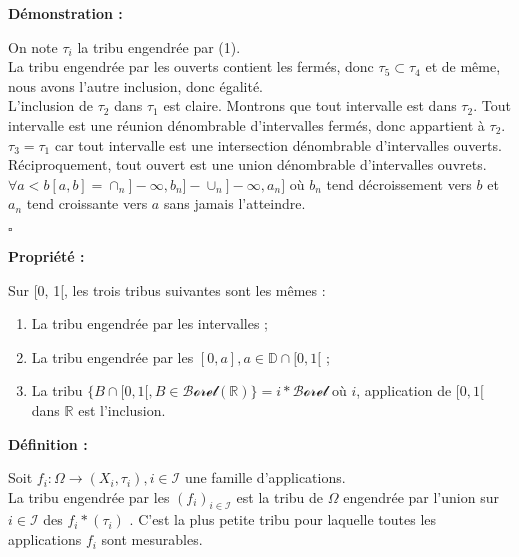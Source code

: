 \documentclass[10pt,a4paper,notitlepage ]{report}
\newcommand{\R}{\mathbb R}
\newenvironment{definition}{
	
	\textbf{Définition : }
}
{}
\newcounter{th}
\newenvironment{propriete}[1][]{
	\begin{tcolorbox}
		\textbf{Propriété #1 : }
}
{\end{tcolorbox}}
\newenvironment{demo}[1][]{

	\textbf{Démonstration #1 :}
}{\begin{flushright}
	$\square$
\end{flushright}
}
\begin{document}
\begin{demo}

On note $\tau _i $ la tribu engendrée par (1).   \\

La tribu engendrée par les ouverts contient les fermés, donc $\tau _5 \subset \tau _4 $ et de même, nous avons l'autre inclusion, donc égalité. \\

L'inclusion de $\tau _2 $ dans $\tau _1$ est claire. Montrons que tout intervalle est dans $\tau _2$. Tout intervalle est une réunion dénombrable d'intervalles fermés, donc appartient à $\tau _2$. \\

$\tau _3 = \tau _1$ car tout intervalle est une intersection dénombrable d'intervalles ouverts. Réciproquement, tout ouvert est une union dénombrable d'intervalles ouvrets. \\

$\forall a < b [a,b] = \cap _n ] -  \infty , b_n ] - \cup _n ] - \infty , a_n ]$ où $b_n$ tend décroissement vers $b$ et $a_n$ tend croissante vers $a$ sans jamais l'atteindre. 

\end{demo}

\begin{propriete}
Sur [0, 1[, les trois tribus suivantes sont les mêmes : 
\begin{enumerate}
\item La tribu engendrée par les intervalles ;
\item La tribu engendrée par les $[0, a], a \in \mathbb{D} \cap [0,1[ $ ;
\item La tribu $\lbrace B \cap [0,1[, B \in \mathcal{Borel} (\R ) \rbrace = i* \mathcal{Borel} $ où $i$, application de $[0,1[$ dans $\mathbb{R}$ est l'inclusion.
\end{enumerate}

\end{propriete}

\begin{definition}
Soit $f_i : \Omega \longrightarrow (X_i , \tau _i ) , i \in \mathcal{I} $ une famille d'applications. \\
La tribu engendrée par les $(f_i ) _{ i \in \mathcal{I} }$ est la tribu de $\Omega$ engendrée par l'union sur $i \in \mathcal{I} $ des $f_i * ( \tau _i ) $ . C'est la plus petite tribu pour laquelle toutes les applications $f_i$ sont mesurables.
\end{definition}
\end{document}
